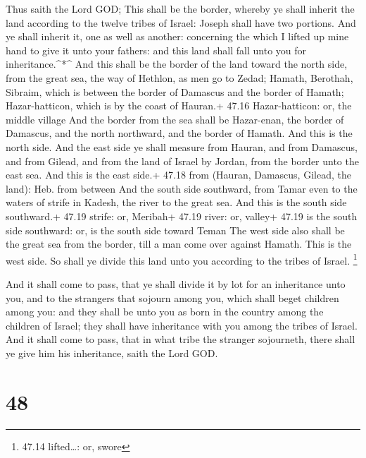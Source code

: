  Thus saith the Lord GOD; This shall be the border, whereby
ye shall inherit the land according to the twelve tribes of Israel:
Joseph shall have two portions.  And ye shall inherit it,
one as well as another: concerning the which I lifted up mine hand to
give it unto your fathers: and this land shall fall unto you for
inheritance.\^{}*\^{}  And this shall be the border of the
land toward the north side, from the great sea, the way of Hethlon, as
men go to Zedad;  Hamath, Berothah, Sibraim, which is
between the border of Damascus and the border of Hamath; Hazar-hatticon,
which is by the coast of Hauran.+ 47.16 Hazar-hatticon: or, the middle
village  And the border from the sea shall be Hazar-enan,
the border of Damascus, and the north northward, and the border of
Hamath. And this is the north side.  And the east side ye
shall measure from Hauran, and from Damascus, and from Gilead, and from
the land of Israel by Jordan, from the border unto the east sea. And
this is the east side.+ 47.18 from (Hauran, Damascus, Gilead, the land):
Heb. from between  And the south side southward, from Tamar
even to the waters of strife in Kadesh, the river to the great sea. And
this is the south side southward.+ 47.19 strife: or, Meribah+ 47.19
river: or, valley+ 47.19 is the south side southward: or, is the south
side toward Teman  The west side also shall be the great
sea from the border, till a man come over against Hamath. This is the
west side.  So shall ye divide this land unto you according
to the tribes of Israel. \footnote{47.14 lifted\ldots: or, swore}

 And it shall come to pass, that ye shall divide it by lot
for an inheritance unto you, and to the strangers that sojourn among
you, which shall beget children among you: and they shall be unto you as
born in the country among the children of Israel; they shall have
inheritance with you among the tribes of Israel.  And it
shall come to pass, that in what tribe the stranger sojourneth, there
shall ye give him his inheritance, saith the Lord GOD.

\hypertarget{section-47}{%
\section{48}\label{section-47}}

